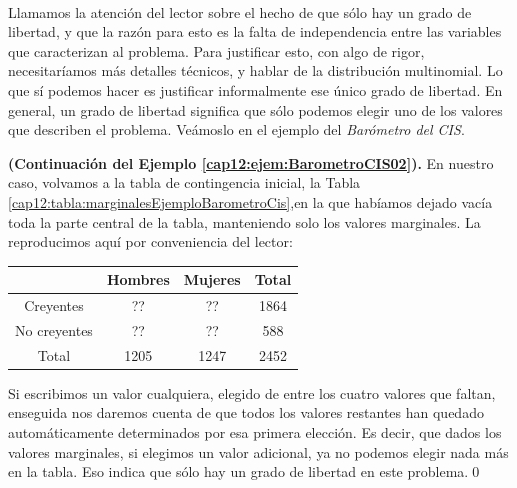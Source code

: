     \\[3mm]
Llamamos la atención del lector sobre el hecho de que sólo hay un grado de libertad, y que la razón para esto es la falta de independencia entre las variables que caracterizan al problema. Para justificar esto, con algo de rigor, necesitaríamos más detalles técnicos, y hablar de la distribución multinomial. Lo que sí podemos hacer es justificar informalmente ese único grado de libertad. En general, un grado de libertad significa que sólo podemos elegir uno de los valores que describen el problema. Veámoslo en el ejemplo del {\em Barómetro del CIS}.
\begin{ejemplo}{\bf (Continuación del Ejemplo \ref{cap12:ejem:BarometroCIS02}).}
\label{cap12:ejem:BarometroCIS03}
En nuestro caso, volvamos a la tabla de contingencia inicial, la Tabla
\ref{cap12:tabla:marginalesEjemploBarometroCis},en la que habíamos dejado vacía toda la parte
central de la tabla, manteniendo solo los valores marginales. La reproducimos aquí por conveniencia
del lector:
    \begin{center}
    \begin{tabular}{|c|c|c|c|}
      \hline
       & Hombres & Mujeres & Total \\
       \hline
      Creyentes & ?? & ?? & 1864\\
      \hline
      No creyentes & ?? & ?? & 588 \\
      \hline
      Total & 1205 & 1247 & 2452 \\
      \hline
    \end{tabular}
    \end{center}
Si escribimos un valor cualquiera, elegido de entre los cuatro valores que faltan, enseguida nos daremos cuenta de que todos los valores restantes han quedado automáticamente determinados por esa primera elección. Es decir, que dados los valores marginales, si elegimos un valor adicional, ya no podemos elegir nada más en la tabla. Eso indica que sólo hay un grado de libertad en este problema.\qed
\end{ejemplo}

